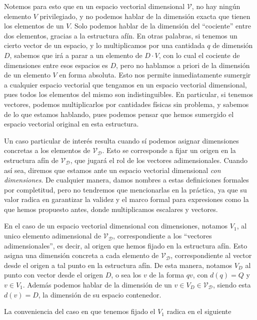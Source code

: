 \documentclass{article}
\begin{document}
Notemos para esto que en un espacio vectorial dimensional $\mathcal{V}$, no hay ningún elemento $V$ privilegiado,
y no podemos hablar de la dimensión exacta que tienen los elementos de un $V$. Solo podemos hablar de la dimensión del
``cociente'' entre dos elementos, gracias a la estructura afín. En otras palabras, si tenemos un cierto vector de un espacio,
y lo multiplicamos por una cantidada $q$ de dimensión $D$, sabemos que irá a parar a un elemento de $D \cdot V$, con lo cual
el cociente de dimensiones entre esos espacios es $D$, pero no hablamos a priori de la dimensión de un elemento $V$ en forma absoluta.
Esto nos permite inmediatamente sumergir a cualquier espacio vectorial que tengamos en un espacio vectorial dimensional,
pues todos los elementos del mismo son indistinguibles. En particular, si tenemos vectores, podemos multiplicarlos por
cantidades físicas sin problema, y sabemos de lo que estamos hablando, pues podemos pensar que hemos sumergido el
espacio vectorial original en esta estructura.

Un caso particular de interés resulta cuando sí podemos asignar dimensiones concretas a los elementos de $\mathcal{V_D}$. Esto
se corresponde a fijar un origen en la estructura afín de $\mathcal{V_D}$, que jugará el rol de los vectores adimensionales.
Cuando así sea, diremos que estamos ante un espacio vectorial dimensional \textit{con dimensiones}. De cualquier manera,
damos nombres a estas definiciones formales por completitud, pero no tendremos que mencionarlas en la práctica, ya que su
valor radica en garantizar la validez y el marco formal para expresiones como la que hemos propuesto antes, donde multiplicamos
escalares y vectores.

En el caso de un espacio vectorial dimensional con dimensiones, notamos $V_1$, al unico elemento adimensional de $\mathcal{V_D}$,
correspondiente a los ``vectores adimensionales'', es decir, al origen que hemos fijado en la estructura afín. Esto asigna una dimensión concreta
a cada elemento de $\mathcal{V_D}$, correspondiente al vector desde el origen a tal punto en la estructura afín. De esta manera, notamos
$V_D$ al punto con vector desde el origen $D$, o sea los $v$ de la forma $q v$, con $d(q) = Q$ y $v \in V_1$. Además
podemos hablar de la dimensión de un $v \in V_D \in \mathcal{V_D}$, siendo esta $d(v) = D$, la dimensión de su espacio contenedor.

La conveniencia del caso en que tenemos fijado el $V_1$ radica en el siguiente
\end{document}
